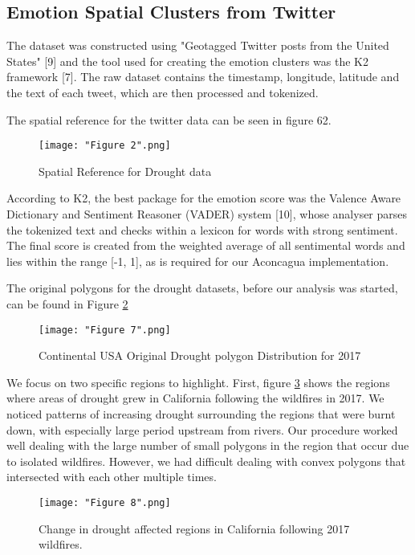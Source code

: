 \documentclass[conference]{IEEEtran}
\begin{document}
\subsection{Emotion Spatial Clusters from Twitter }

The dataset was constructed using "Geotagged Twitter posts from the United States" [9] and the tool used for creating the emotion clusters was the K2 framework [7]. The raw dataset contains the timestamp, longitude, latitude and the text of each tweet, which are then processed and tokenized.

The spatial reference for the twitter data can be seen in figure 62.
\begin{figure}[ht]
\centerline{\texttt{[image: "Figure 2".png]}}
\caption{Spatial Reference for Drought data}
\label{Figure 6}
\end{figure}

According to K2, the best package for the emotion score was the Valence Aware Dictionary and Sentiment Reasoner (VADER) system [10], whose analyser parses the tokenized text and checks within a lexicon for words with strong sentiment. The final score is created from the weighted average of all sentimental words and lies within the range [-1, 1], as is required for our Aconcagua implementation.



The original polygons for the drought datasets, before our analysis was started, can be found in Figure \ref{Figure 7}

\begin{figure}[ht]
\centerline{\texttt{[image: "Figure 7".png]}}
\caption{Continental USA  Original Drought polygon Distribution for 2017}
\label{Figure 7}
\end{figure}

We focus on two specific regions to highlight. First, figure \ref{Figure 8} shows the regions where areas of drought grew in California following the wildfires in 2017. We noticed patterns of increasing drought surrounding the regions that were burnt down, with especially large period upstream from rivers. Our procedure worked well dealing with the large number of small polygons in the region that occur due to isolated wildfires. However, we had difficult dealing with convex polygons that intersected with each other multiple times.

\begin{figure}[ht]
\centerline{\texttt{[image: "Figure 8".png]}}
\caption{Change in drought affected regions in California following 2017 wildfires.}
\label{Figure 8}
\end{figure}
\end{document}
